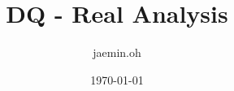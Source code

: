 \documentclass{amsart}
\date{\today}
\begin{document}
\author{jaemin.oh}
\title{DQ - Real Analysis}

\maketitle

\end{document}
